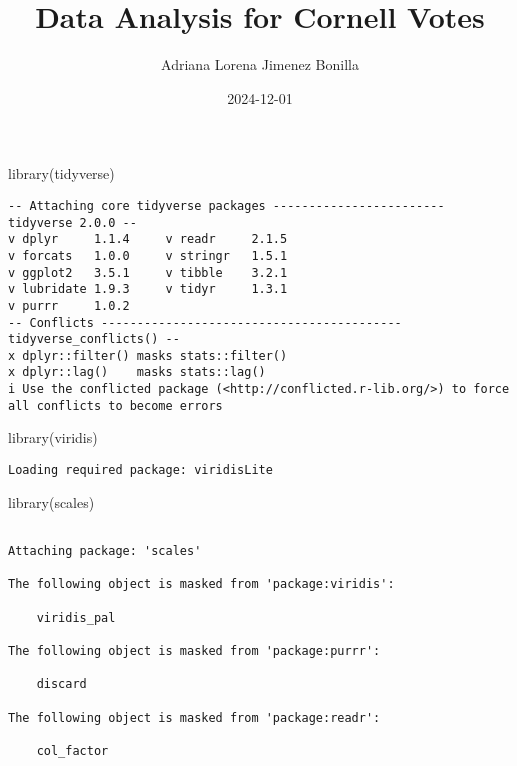 \documentclass[
  letterpaper,
  DIV=11,
  numbers=noendperiod]{scrartcl}
\title{Data Analysis for Cornell Votes}
\author{Adriana Lorena Jimenez Bonilla}
\date{2024-12-01}
\newenvironment{Shaded}{\begin{snugshade}}{\end{snugshade}}
\newcommand{\FunctionTok}[1]{\textcolor[rgb]{0.28,0.35,0.67}{#1}}
\newcommand{\NormalTok}[1]{\textcolor[rgb]{0.00,0.23,0.31}{#1}}
\begin{document}
\maketitle


\begin{Shaded}
\begin{Highlighting}[]
\FunctionTok{library}\NormalTok{(tidyverse)}
\end{Highlighting}
\end{Shaded}

\begin{verbatim}
-- Attaching core tidyverse packages ------------------------ tidyverse 2.0.0 --
v dplyr     1.1.4     v readr     2.1.5
v forcats   1.0.0     v stringr   1.5.1
v ggplot2   3.5.1     v tibble    3.2.1
v lubridate 1.9.3     v tidyr     1.3.1
v purrr     1.0.2     
-- Conflicts ------------------------------------------ tidyverse_conflicts() --
x dplyr::filter() masks stats::filter()
x dplyr::lag()    masks stats::lag()
i Use the conflicted package (<http://conflicted.r-lib.org/>) to force all conflicts to become errors
\end{verbatim}

\begin{Shaded}
\begin{Highlighting}[]
\FunctionTok{library}\NormalTok{(viridis)}
\end{Highlighting}
\end{Shaded}

\begin{verbatim}
Loading required package: viridisLite
\end{verbatim}

\begin{Shaded}
\begin{Highlighting}[]
\FunctionTok{library}\NormalTok{(scales)}
\end{Highlighting}
\end{Shaded}

\begin{verbatim}

Attaching package: 'scales'

The following object is masked from 'package:viridis':

    viridis_pal

The following object is masked from 'package:purrr':

    discard

The following object is masked from 'package:readr':

    col_factor
\end{verbatim}
\end{document}
